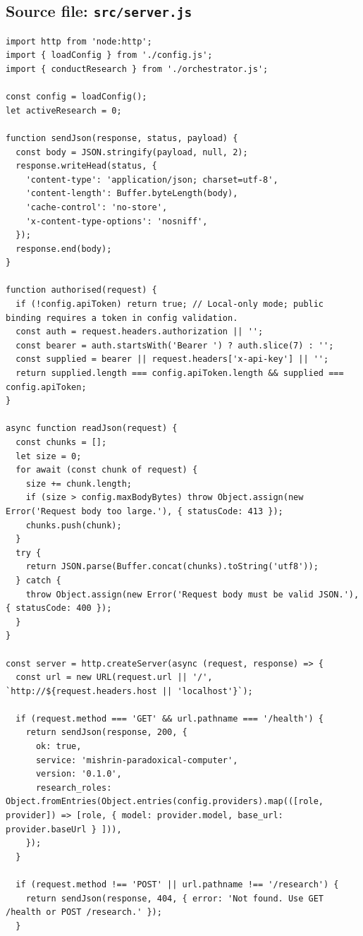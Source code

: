 \documentclass[10pt,a4paper]{article}
\begin{document}
\subsection{Source file: \texttt{src/server.js}}
\begin{lstlisting}
import http from 'node:http';
import { loadConfig } from './config.js';
import { conductResearch } from './orchestrator.js';

const config = loadConfig();
let activeResearch = 0;

function sendJson(response, status, payload) {
  const body = JSON.stringify(payload, null, 2);
  response.writeHead(status, {
    'content-type': 'application/json; charset=utf-8',
    'content-length': Buffer.byteLength(body),
    'cache-control': 'no-store',
    'x-content-type-options': 'nosniff',
  });
  response.end(body);
}

function authorised(request) {
  if (!config.apiToken) return true; // Local-only mode; public binding requires a token in config validation.
  const auth = request.headers.authorization || '';
  const bearer = auth.startsWith('Bearer ') ? auth.slice(7) : '';
  const supplied = bearer || request.headers['x-api-key'] || '';
  return supplied.length === config.apiToken.length && supplied === config.apiToken;
}

async function readJson(request) {
  const chunks = [];
  let size = 0;
  for await (const chunk of request) {
    size += chunk.length;
    if (size > config.maxBodyBytes) throw Object.assign(new Error('Request body too large.'), { statusCode: 413 });
    chunks.push(chunk);
  }
  try {
    return JSON.parse(Buffer.concat(chunks).toString('utf8'));
  } catch {
    throw Object.assign(new Error('Request body must be valid JSON.'), { statusCode: 400 });
  }
}

const server = http.createServer(async (request, response) => {
  const url = new URL(request.url || '/', `http://${request.headers.host || 'localhost'}`);

  if (request.method === 'GET' && url.pathname === '/health') {
    return sendJson(response, 200, {
      ok: true,
      service: 'mishrin-paradoxical-computer',
      version: '0.1.0',
      research_roles: Object.fromEntries(Object.entries(config.providers).map(([role, provider]) => [role, { model: provider.model, base_url: provider.baseUrl } ])),
    });
  }

  if (request.method !== 'POST' || url.pathname !== '/research') {
    return sendJson(response, 404, { error: 'Not found. Use GET /health or POST /research.' });
  }


\end{lstlisting}
\end{document}
